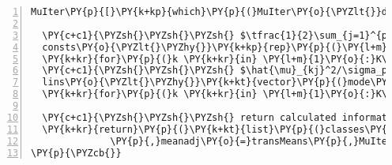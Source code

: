 \begin{Verbatim}[commandchars=\\\{\},codes={\catcode`\$=3\catcode`\^=7\catcode`\_=8},gobble=0,numbers=left,fontfamily=fvm,fontshape=n,fontsize=\footnotesize,tabsize=2]
  MuIter\PY{p}{[}\PY{k+kp}{which}\PY{p}{(}MuIter\PY{o}{\PYZlt{}}deltatol\PY{p}{)}\PY{p}{]}\PY{o}{\PYZlt{}\PYZhy{}}\PY{l+m}{0}
  
  \PY{c+c1}{\PYZsh{}\PYZsh{}\PYZsh{} $\tfrac{1}{2}\sum_{j=1}^{p}\hat{\mu}_{kj}^2$ constant term}
  consts\PY{o}{\PYZlt{}\PYZhy{}}\PY{k+kp}{rep}\PY{p}{(}\PY{l+m}{0}\PY{p}{,}K\PY{p}{)}
  \PY{k+kr}{for}\PY{p}{(}k \PY{k+kr}{in} \PY{l+m}{1}\PY{o}{:}K\PY{p}{)} consts\PY{p}{[}k\PY{p}{]}\PY{o}{\PYZlt{}\PYZhy{}}\PY{l+m}{0.5}\PY{o}{*}\PY{k+kp}{sum}\PY{p}{(}MuIter\PY{p}{[}k\PY{p}{,}\PY{p}{]}\PY{o}{\PYZca{}}\PY{l+m}{2}\PY{o}{/}sigmasqs\PY{p}{)}
  \PY{c+c1}{\PYZsh{}\PYZsh{}\PYZsh{} $\hat{\mu}_{kj}^2/\sigma_p^2$ term}
  lins\PY{o}{\PYZlt{}\PYZhy{}}\PY{k+kt}{vector}\PY{p}{(}mode\PY{o}{=}\PY{l+s}{\PYZdq{}}\PY{l+s}{list\PYZdq{}}\PY{p}{,}length\PY{o}{=}K\PY{p}{)}
  \PY{k+kr}{for}\PY{p}{(}k \PY{k+kr}{in} \PY{l+m}{1}\PY{o}{:}K\PY{p}{)} lins\PY{p}{[[}k\PY{p}{]]}\PY{o}{\PYZlt{}\PYZhy{}}MuIter\PY{p}{[}k\PY{p}{,}\PY{p}{]}\PY{o}{/}sigmasqs
  
  \PY{c+c1}{\PYZsh{}\PYZsh{}\PYZsh{} return calculated information as list object}
  \PY{k+kr}{return}\PY{p}{(}\PY{k+kt}{list}\PY{p}{(}classes\PY{o}{=}classnames\PY{p}{,}consts\PY{o}{=}consts\PY{p}{,}lins\PY{o}{=}lins\PY{p}{,}prior\PY{o}{=}priors
              \PY{p}{,}meanadj\PY{o}{=}transMeans\PY{p}{,}MuIter\PY{o}{=}MuIter\PY{p}{,}InitMu\PY{o}{=}MuMat\PY{p}{)}\PY{p}{)}
\PY{p}{\PYZcb{}}
\end{Verbatim}
